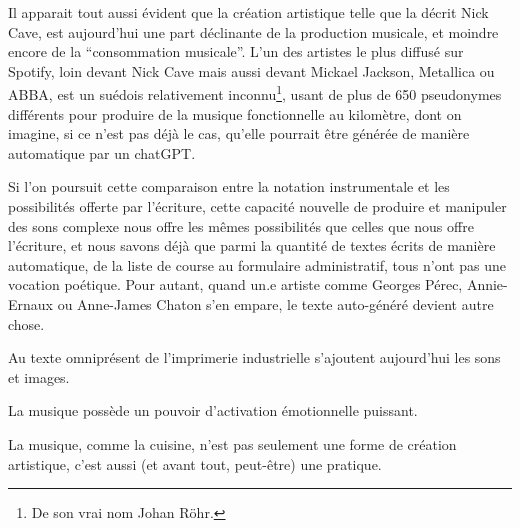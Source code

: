 Il apparait tout aussi évident que la création artistique telle que la décrit Nick Cave, est aujourd'hui une part déclinante de la production musicale, et moindre encore de la ``consommation musicale''. L'un des artistes le plus diffusé sur Spotify, loin devant Nick Cave mais aussi devant Mickael Jackson, Metallica ou ABBA, est un suédois relativement inconnu\footnote{De son vrai nom Johan Röhr.}, usant de plus de 650 pseudonymes différents pour produire de la musique fonctionnelle au kilomètre, dont on imagine, si ce n'est pas déjà le cas, qu'elle pourrait être générée de manière automatique par un chatGPT.

Si l'on poursuit cette comparaison entre la notation instrumentale et les possibilités offerte par l'écriture, cette capacité nouvelle de produire et manipuler des sons complexe nous offre les mêmes possibilités que celles que nous offre l'écriture, et nous savons déjà que parmi la quantité de textes écrits de manière automatique, de la liste de course au formulaire administratif, tous n'ont pas une vocation poétique. Pour autant, quand un.e artiste comme Georges Pérec, Annie-Ernaux ou Anne-James Chaton s'en empare, le texte auto-généré devient autre chose.

Au texte omniprésent de l'imprimerie industrielle s'ajoutent aujourd'hui les sons et images.

La musique possède un pouvoir d'activation émotionnelle puissant.

La musique, comme la cuisine, n'est pas seulement une forme de création artistique, c'est aussi (et avant tout, peut-être) une pratique.





